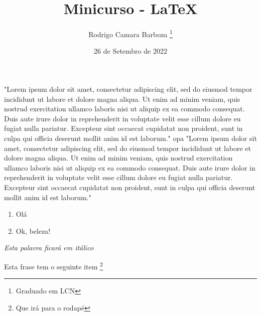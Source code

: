 \documentclass[12pt, a4paper]{article}
\begin{document}
\title{Minicurso - LaTeX}
\author {Rodrigo Camara Barboza \footnote{Graduado em LCN}}
\date {26 de Setembro de 2022}
\maketitle

"Lorem ipsum dolor sit amet, consectetur adipiscing elit, sed do eiusmod tempor incididunt ut labore et dolore magna aliqua. Ut enim ad minim veniam, quis nostrud exercitation ullamco laboris nisi ut aliquip ex ea commodo consequat. Duis aute irure dolor in reprehenderit in voluptate velit esse cillum dolore eu fugiat nulla pariatur. Excepteur sint occaecat cupidatat non proident, sunt in culpa qui officia deserunt mollit anim id est laborum." \newline
opa
"Lorem ipsum dolor sit amet, consectetur adipiscing elit, sed do eiusmod tempor incididunt ut labore et dolore magna aliqua. Ut enim ad minim veniam, quis nostrud exercitation ullamco laboris nisi ut aliquip ex ea commodo consequat. Duis aute irure dolor in reprehenderit in voluptate velit esse cillum dolore eu fugiat nulla pariatur. Excepteur sint occaecat cupidatat non proident, sunt in culpa qui officia deserunt mollit anim id est laborum."


\begin{enumerate}
	\item Olá
	\item Ok, beleza!
\end{enumerate}

\textit {Esta palavra ficará em itálico}

Esta frase tem o seguinte item \footnote{Que irá para o rodapé}

%
\end{document}

